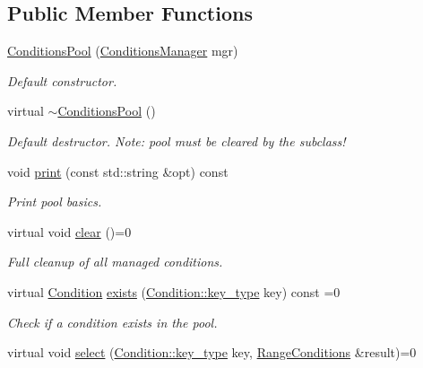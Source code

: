 \subsection*{Public Member Functions}
\begin{DoxyCompactItemize}
\item 
\hyperlink{class_d_d4hep_1_1_conditions_1_1_conditions_pool_a4aec4f20a1422387f1814fdcb75f66c1}{Conditions\+Pool} (\hyperlink{class_d_d4hep_1_1_conditions_1_1_conditions_manager}{Conditions\+Manager} mgr)
\begin{DoxyCompactList}\small\item\em Default constructor. \end{DoxyCompactList}\item 
virtual \hyperlink{class_d_d4hep_1_1_conditions_1_1_conditions_pool_a33a9ee6f763731cf1fd02b8a102b5217}{$\sim$\+Conditions\+Pool} ()
\begin{DoxyCompactList}\small\item\em Default destructor. Note\+: pool must be cleared by the subclass! \end{DoxyCompactList}\item 
void \hyperlink{class_d_d4hep_1_1_conditions_1_1_conditions_pool_ab84fe8f33366979c379fe2a625bd9a98}{print} (const std\+::string \&opt) const
\begin{DoxyCompactList}\small\item\em Print pool basics. \end{DoxyCompactList}\item 
virtual void \hyperlink{class_d_d4hep_1_1_conditions_1_1_conditions_pool_aaa515e23b412a5da244f6c4e6bf13220}{clear} ()=0
\begin{DoxyCompactList}\small\item\em Full cleanup of all managed conditions. \end{DoxyCompactList}\item 
virtual \hyperlink{class_d_d4hep_1_1_conditions_1_1_condition}{Condition} \hyperlink{class_d_d4hep_1_1_conditions_1_1_conditions_pool_aa37de3a69489da065b3515c7119b3145}{exists} (\hyperlink{class_d_d4hep_1_1_conditions_1_1_condition_a7528efa762e8cc072ef80ea67c3531f9}{Condition\+::key\+\_\+type} key) const =0
\begin{DoxyCompactList}\small\item\em Check if a condition exists in the pool. \end{DoxyCompactList}\item 
virtual void \hyperlink{class_d_d4hep_1_1_conditions_1_1_conditions_pool_a742ca5a35a44037e523a7e654924c5eb}{select} (\hyperlink{class_d_d4hep_1_1_conditions_1_1_condition_a7528efa762e8cc072ef80ea67c3531f9}{Condition\+::key\+\_\+type} key, \hyperlink{namespace_d_d4hep_1_1_conditions_ae765f0140a33973a430280f02b6062f4}{Range\+Conditions} \&result)=0

\end{DoxyCompactItemize}
